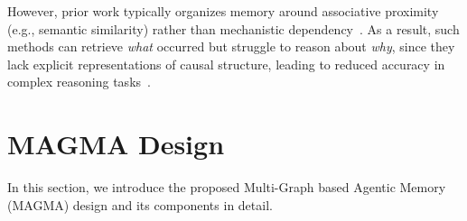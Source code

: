 \documentclass[11pt]{article}
\begin{document}
However, prior work typically organizes memory around associative proximity (e.g., semantic similarity) rather than mechanistic dependency~\citep{kiciman2023causal}. As a result, such methods can retrieve \textit{what} occurred but struggle to reason about \textit{why}, since they lack explicit representations of causal structure, leading to reduced accuracy in complex reasoning tasks~\citep{jin2023cladder, zhang2025igniting}.

\section{MAGMA Design}
\label{sec:system}
In this section, we introduce the proposed Multi-Graph based Agentic Memory (MAGMA) design and its components in detail.
\end{document}
